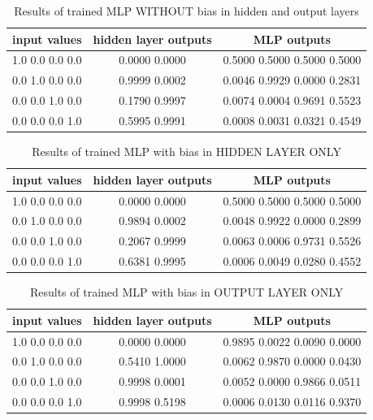 \documentclass{classrep}
\begin{document}
{        \begin{table}[!htbp]
            \centering
            \begin{tabular}{|c|c|c|}
                \hline
                input values & hidden layer outputs & MLP outputs \\ \hline
                1.0 0.0 0.0 0.0 & 0.0000 0.0000 & 0.5000 0.5000 0.5000 0.5000 \\
                0.0 1.0 0.0 0.0 & 0.9999 0.0002 & 0.0046 0.9929 0.0000 0.2831 \\
                0.0 0.0 1.0 0.0 & 0.1790 0.9997 & 0.0074 0.0004 0.9691 0.5523 \\
                0.0 0.0 0.0 1.0 & 0.5995 0.9991 & 0.0008 0.0031 0.0321 0.4549 \\ \hline
            \end{tabular}
            \caption{Results of trained MLP WITHOUT bias in hidden and output layers}
            \label{tab:without_bias_results}
        \end{table}
        \FloatBarrier

        \begin{table}[!htbp]
            \centering
            \begin{tabular}{|c|c|c|}
                \hline
                input values & hidden layer outputs & MLP outputs \\ \hline
                1.0 0.0 0.0 0.0 & 0.0000 0.0000 & 0.5000 0.5000 0.5000 0.5000 \\
                0.0 1.0 0.0 0.0 & 0.9894 0.0002 & 0.0048 0.9922 0.0000 0.2899 \\
                0.0 0.0 1.0 0.0 & 0.2067 0.9999 & 0.0063 0.0006 0.9731 0.5526 \\
                0.0 0.0 0.0 1.0 & 0.6381 0.9995 & 0.0006 0.0049 0.0280 0.4552 \\ \hline
            \end{tabular}
            \caption{Results of trained MLP with bias in HIDDEN LAYER ONLY}
            \label{tab:0with_bias_results}
        \end{table}
        \FloatBarrier

        \begin{table}[!htbp]
            \centering
            \begin{tabular}{|c|c|c|}
                \hline
                input values & hidden layer outputs & MLP outputs \\ \hline
                1.0 0.0 0.0 0.0 & 0.0000 0.0000 & 0.9895 0.0022 0.0090 0.0000 \\
                0.0 1.0 0.0 0.0 & 0.5410 1.0000 & 0.0062 0.9870 0.0000 0.0430 \\
                0.0 0.0 1.0 0.0 & 0.9998 0.0001 & 0.0052 0.0000 0.9866 0.0511 \\
                0.0 0.0 0.0 1.0 & 0.9998 0.5198 & 0.0006 0.0130 0.0116 0.9370 \\ \hline
            \end{tabular}
            \caption{Results of trained MLP with bias in OUTPUT LAYER ONLY}
            \label{tab:1with_bias_results}
        \end{table}
        \FloatBarrier
    }
\end{document}
